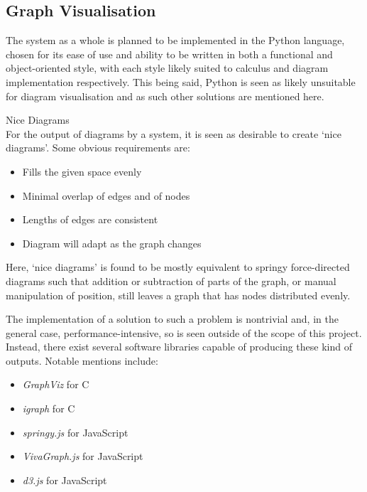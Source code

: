 \subsection{Graph Visualisation}

    The system as a whole is planned to be implemented in the Python language, chosen for its ease of use and ability to be written in both a functional and object-oriented style, with each style likely suited to calculus and diagram implementation respectively.
    This being said, Python is seen as likely unsuitable for diagram visualisation and as such other solutions are mentioned here.\\
    
    \begin{definition*}{Nice Diagrams\\}
        For the output of diagrams by a system, it is seen as desirable to create `nice diagrams'.
        Some obvious requirements are:
        \begin{itemize}
            \item Fills the given space evenly
            \item Minimal overlap of edges and of nodes
            \item Lengths of edges are consistent
            \item Diagram will adapt as the graph changes
        \end{itemize}
        Here, `nice diagrams' is found to be mostly equivalent to springy force-directed diagrams such that addition or subtraction of parts of the graph, or manual manipulation of position, still leaves a graph that has nodes distributed evenly.
    \end{definition*}


    \begin{examples}
        The implementation of a solution to such a problem is nontrivial and, in the general case, performance-intensive, so is seen outside of the scope of this project.
        Instead, there exist several software libraries capable of producing these kind of outputs.
        Notable mentions include:
        \begin{itemize}
            \item \textit{GraphViz} for C~\footnotemark
            \item \textit{igraph} for C~\addtocounter{footnote}{-1}\footnotemark
            \item \textit{springy.js} for JavaScript
            \item \textit{VivaGraph.js} for JavaScript
            \item \textit{d3.js} for JavaScript
        \end{itemize}
    \end{examples}

